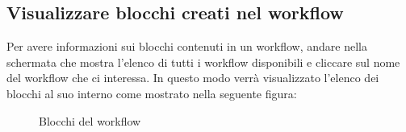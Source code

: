 \subsection{Visualizzare blocchi creati nel workflow}
Per avere informazioni sui blocchi contenuti in un workflow, andare nella schermata che mostra l'elenco di tutti i workflow disponibili  e cliccare sul nome del workflow che ci interessa.
In questo modo verrà visualizzato l'elenco dei blocchi al suo interno come mostrato nella seguente figura:
\begin{figure}[!ht]
	\centering
	\caption{Blocchi del workflow}
\end{figure}
\newpage

